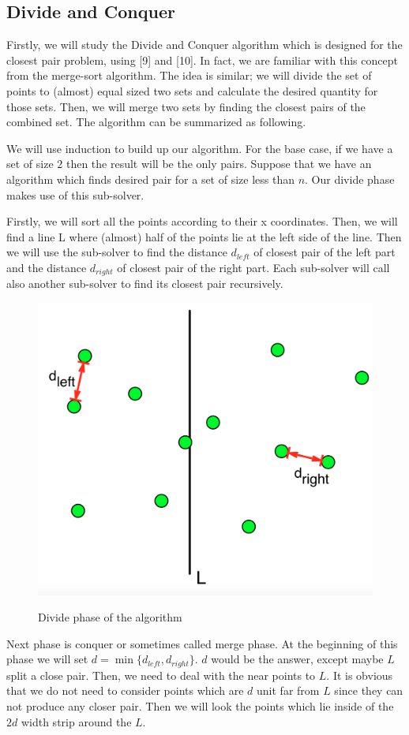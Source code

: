\documentclass[12pt]{article}
\begin{document}
\subsection{Divide and Conquer}

Firstly, we will study the Divide and Conquer algorithm which is designed for the closest pair problem, using [9] and [10]. In fact, we are familiar with this concept from the
merge-sort algorithm. The idea is similar; we will divide the set of points to
(almost) equal sized two sets and calculate the desired quantity for those 
sets. Then, we will merge two sets by finding the closest pairs of the combined set.
The algorithm can be summarized as following.

We will use induction to build up our algorithm. For the base case, 
if we have a set of size $2$ then the result will be the only pairs. 
Suppose that we have an algorithm which finds desired pair for a set of 
size less than $n$. Our divide phase makes use of this sub-solver.

Firstly, we will sort all the points according to their x coordinates. Then, 
we will find a line L where (almost) half of the points lie at the left side 
of the line. Then we will use the sub-solver to find the distance $d_{left}$
of closest pair of the left part and the distance $d_{right}$ of closest pair
of the right part. Each sub-solver will call also another 
sub-solver to find its closest pair recursively.
\begin{center}
  \begin{figure}[]
    \centering
    \includegraphics[width=.5\linewidth]{figures/fig19.png}
    \label{fig:20}
    \caption{Divide phase of the algorithm}
  \end{figure}
\end{center}
Next phase is conquer or sometimes called merge phase. At the beginning of this
phase we will set $d=\min\{d_{left}, d_{right}\}$. $d$ would be the answer,
except maybe $L$ split a close pair. Then, we need to deal with the 
near points to $L$. It is obvious that we do not need to consider points 
which are $d$ unit far from $L$ since they can not produce any closer pair.
Then we will look the points which lie inside of the $2d$ width strip around the
$L$.
\end{document}
